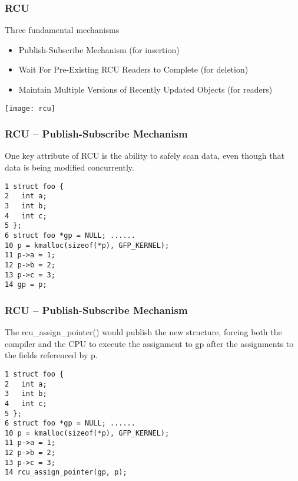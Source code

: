 \begin{frame}[fragile]
    \frametitle{RCU}
    \Large
    Three fundamental mechanisms
    \begin{itemize}
        \item  Publish-Subscribe Mechanism (for insertion) 
        \item  Wait For Pre-Existing RCU Readers to Complete (for deletion) 
        \item Maintain Multiple Versions of Recently Updated Objects (for readers) 
    \end{itemize}
    \centering
    \texttt{[image: rcu]}
    
    
%    
%    
%    
\end{frame}


\begin{frame}[fragile]
    \frametitle{RCU -- Publish-Subscribe Mechanism}
    \Large
    One key attribute of RCU is the ability to safely scan data, even though that data is being modified concurrently.
    
\small
    \begin{block}{}
    \begin{verbatim}
1 struct foo {
2   int a;
3   int b;
4   int c;
5 };
6 struct foo *gp = NULL; ......
10 p = kmalloc(sizeof(*p), GFP_KERNEL);
11 p->a = 1;
12 p->b = 2;
13 p->c = 3;
14 gp = p;
\end{verbatim}
\end{block}  
\end{frame}


\begin{frame}[fragile]
    \frametitle{RCU -- Publish-Subscribe Mechanism}
    \Large
The rcu\_assign\_pointer() would publish the new structure, forcing both the compiler and the CPU to execute the assignment to gp after the assignments to the fields referenced by p. 
    
    \small
    \begin{block}{}
        \begin{verbatim}
1 struct foo {
2   int a;
3   int b;
4   int c;
5 };
6 struct foo *gp = NULL; ......
10 p = kmalloc(sizeof(*p), GFP_KERNEL);
11 p->a = 1;
12 p->b = 2;
13 p->c = 3;
14 rcu_assign_pointer(gp, p);
        \end{verbatim}
    \end{block}  
\end{frame}


